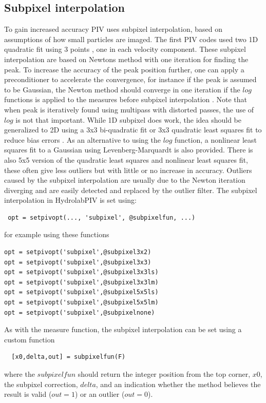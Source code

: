 \documentclass[10pt]{article}
\begin{document}
\subsection{Subpixel interpolation}
\label{subpixel}
To gain increased accuracy PIV uses subpixel interpolation, based on assumptions of how small particles are
imaged. The first PIV codes used two 1D quadratic fit using 3 points \cite{Raffel2007}, one in each velocity component.
These subpixel interpolation are based on Newtons method with one iteration for finding the peak. 
To increase the accuracy of the peak position further, one can apply a preconditioner to accelerate the convergence,
for instance if the peak is assumed to be Gaussian, the Newton method should converge in one iteration
if the $log$ functions is applied to the measures before subpixel interpolation \citep{Willert1991}.
Note that when peak is iteratively found using multipass with distorted passes, the use of $log$ is not that important.
While 1D subpixel does work, the idea should be generalized to 2D 
using a 3x3 bi-quadratic fit or 3x3 quadratic least squares fit to reduce bias errors \citep{Nobach2005}.
As an alternative to using the $log$ function, a nonlinear least squares fit to a Gaussian using Levenberg-Marquardt is also provided.
There is also 5x5 version of the quadratic least squares and nonlinear least squares fit, these 
often give less outliers but with little or no increase in accuracy.
Outliers caused by the subpixel interpolation are usually due to the Newton iteration diverging 
and are easily detected and replaced by the outlier filter.
The subpixel interpolation in HydrolabPIV is set using:
\begin{lstlisting}
 opt = setpivopt(..., 'subpixel', @subpixelfun, ...) 
\end{lstlisting}
for example using these functions
  \begin{lstlisting}
opt = setpivopt('subpixel',@subpixel3x2)
opt = setpivopt('subpixel',@subpixel3x3)
opt = setpivopt('subpixel',@subpixel3x3ls)
opt = setpivopt('subpixel',@subpixel3x3lm)
opt = setpivopt('subpixel',@subpixel5x5ls)
opt = setpivopt('subpixel',@subpixel5x5lm)
opt = setpivopt('subpixel',@subpixelnone)
\end{lstlisting}
As with the measure function, the subpixel interpolation can be set using a custom function  
\begin{lstlisting} 
  [x0,delta,out] = subpixelfun(F)
\end{lstlisting}
where the $subpixelfun$ should return the integer position from the top corner, $x0$, 
the subpixel correction, $delta$, and an indication whether the method 
believes the result is valid ($out=1$) or an outlier ($out=0$). 

  


   
   
   
   

  
  
    
  

\end{document}
